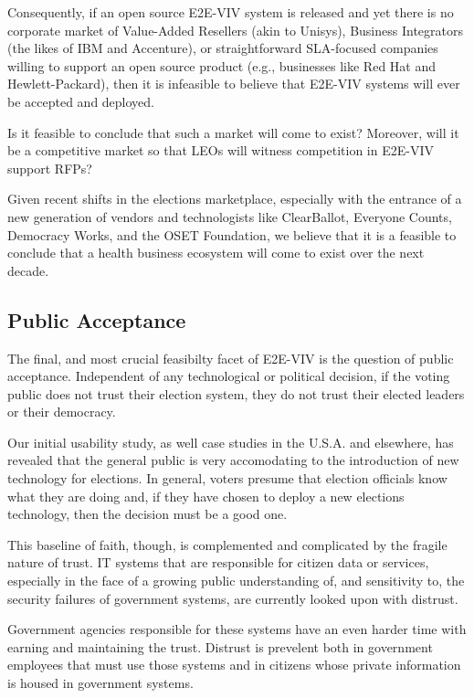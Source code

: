 Consequently, if an open source E2E-VIV system is released and yet
there is no corporate market of Value-Added Resellers (akin to
Unisys), Business Integrators (the likes of IBM and Accenture), or
straightforward SLA-focused companies willing to support an open
source product (e.g., businesses like Red Hat and Hewlett-Packard),
then it is infeasible to believe that E2E-VIV systems will ever be
accepted and deployed.

Is it feasible to conclude that such a market will come to exist?
Moreover, will it be a competitive market so that LEOs will witness
competition in E2E-VIV support RFPs?  

Given recent shifts in the elections marketplace, especially with the
entrance of a new generation of vendors and technologists like
ClearBallot, Everyone Counts, Democracy Works, and the OSET
Foundation, we believe that it is a feasible to conclude that a health
business ecosystem will come to exist over the next decade.

\subsection{Public Acceptance}

The final, and most crucial feasibilty facet of E2E-VIV is the
question of public acceptance.  Independent of any technological or
political decision, if the voting public does not trust their election
system, they do not trust their elected leaders or their democracy.

Our initial usability study, as well case studies in the U.S.A. and
elsewhere, has revealed that the general public is very accomodating
to the introduction of new technology for elections.  In general,
voters presume that election officials know what they are doing and,
if they have chosen to deploy a new elections technology, then the
decision must be a good one.

This baseline of faith, though, is complemented and complicated by the
fragile nature of trust.  IT systems that are responsible for citizen
data or services, especially in the face of a growing public
understanding of, and sensitivity to, the security failures of
government systems, are currently looked upon with distrust.

Government agencies responsible for these systems have an even harder
time with earning and maintaining the trust.  Distrust is prevelent
both in government employees that must use those systems and in
citizens whose private information is housed in government systems.

